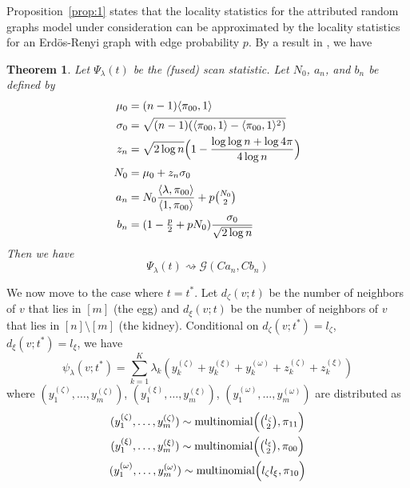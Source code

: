 \documentclass[draftcls]{IEEEtran}
\newtheorem{theorem}{Theorem}
\theoremstyle{definition}
\begin{document}
Proposition~\ref{prop:1} states that the locality
statistics for the attributed random graphs model under consideration
can be approximated by the locality statistics for an
Erd\"{o}s-Renyi graph with edge probability $p$. By a result in
\cite{rukhin:_limit_distr_graph_scan_statis}, we have
\begin{theorem}
  \label{thm:2}
  Let $\Psi_{\lambda}(t)$ be the (fused) scan statistic. Let
  $N_{0}$, $a_n$, and $b_n$ be defined by
\begin{align*}
   \mu_0 &= (n-1) \langle \pi_{00}, 1 \rangle \\
 \sigma_0 &= \sqrt{(n-1) (\langle \pi_{00}, 1 \rangle - \langle
   \pi_{00}, 1 \rangle^2)} \\ 
 z_n &= \sqrt{2
      \log{n}}\Bigl(1 - \frac{\log{\log{n}} + \log{4 \pi}}{4
      \log{n}}\Bigr) \\
    N_{0} &= \mu_0 + z_n \sigma_0 \\
   a_n &= N_{0} \frac{\langle \lambda, \pi_{00} \rangle}{\langle 1,
     \pi_{00} \rangle} + p\tbinom{N_{0}}{2} \\ 
   b_n &= (1 - \tfrac{p}{2} + p N_{0}) \frac{\sigma_0}{\sqrt{2 \log
     n}}
\end{align*}
Then we have
\begin{equation}
  \Psi_{\lambda}(t) \rightsquigarrow \mathcal{G}(C a_n, C b_n)
\end{equation}
\end{theorem}
We now move to the case where $t = t^{*}$. Let $d_{\zeta}(v;t)$ be
the number of neighbors of $v$ that lies in $[m]$ (the egg) and
$d_{\xi}(v;t)$ be the number of neighbors of $v$ that lies in $[n]
\setminus [m]$ (the kidney). Conditional on $d_{\zeta}(v;t^{*}) =
l_{\zeta}$, $d_{\xi}(v;t^{*}) = l_{\xi}$, we have
\begin{equation}
  \psi_{\lambda}(v;t^{*}) = \sum_{k=1}^{K} \lambda_k ( y^{(\zeta)}_k + y^{(\xi)}_k +
  y^{(\omega)}_k + z^{(\zeta)}_k + z^{(\xi)}_k)
\end{equation}
where $(y^{(\zeta)}_1, \dots, y^{(\zeta)}_m)$, $(y^{(\xi)}_1,\dots,
 y^{(\xi)}_m)$, $(y^{(\omega)}_1, \dots, y^{(\omega)}_m)$ are
 distributed as
\begin{gather*}
(y^{(\zeta)}_1,\dots,y^{(\zeta)}_m) \sim \textrm{multinomial}\Bigl(
\tbinom{l_\zeta}{2}, \pi_{11}\Bigr) \\ 
(y^{(\xi)}_1,\dots,y^{(\xi)}_m) \sim \textrm{multinomial}\Bigl(
\tbinom{l_\xi}{2}, \pi_{00}\Bigr) \\
(y^{(\omega)}_1,\dots,y^{(\omega)}_m) \sim \textrm{multinomial}\Bigl(
l_\zeta l_\xi, \pi_{10}\Bigr)
\end{gather*}
\end{document}
